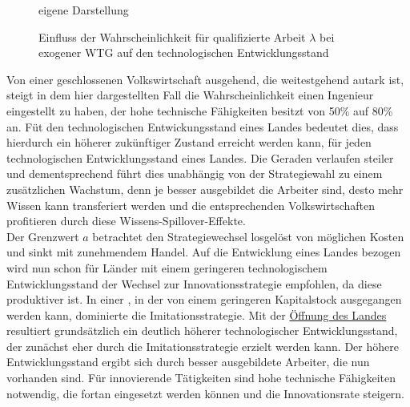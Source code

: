 	\begin{figure}[htbp] 
		\hfill{}  eigene Darstellung
		\caption{Einfluss der Wahrscheinlichkeit für qualifizierte Arbeit $\lambda$ bei exogener WTG auf den technologischen Entwicklungsstand}
		\label{lambdaExo}
	\end{figure}
%
Von einer geschlossenen Volkswirtschaft ausgehend, die weitestgehend autark ist, steigt in dem hier dargestellten Fall die Wahrscheinlichkeit einen Ingenieur eingestellt zu haben, der hohe technische Fähigkeiten besitzt von 50\% auf 80\% an. Füt den technologischen Entwickungsstand eines Landes bedeutet dies, dass hierdurch ein höherer zukünftiger Zustand erreicht werden kann, für jeden technologischen Entwicklungsstand eines Landes. Die Geraden verlaufen steiler und dementsprechend führt dies unabhängig von der Strategiewahl zu einem zusätzlichen Wachstum, denn je besser ausgebildet die Arbeiter sind, desto mehr Wissen kann transferiert werden und die entsprechenden Volkswirtschaften profitieren durch diese Wissens-Spillover-Effekte.\\ 
%
Der Grenzwert $\hat{a}$ betrachtet den Strategiewechsel losgelöst von möglichen Kosten und sinkt mit zunehmendem Handel. Auf die Entwicklung eines Landes bezogen wird nun schon für Länder mit einem geringeren technologischem Entwicklungsstand der Wechsel zur \textcolor[rgb]{0.74,0.97,0.22}{Innovationsstrategie} empfohlen, da diese produktiver ist. In einer , in der von einem geringeren Kapitalstock ausgegangen werden kann, dominierte die \textcolor[rgb]{0,0.32,0}{Imitationsstrategie}. Mit der \underline{Öffnung des Landes} resultiert grundsätzlich ein deutlich höherer technologischer Entwicklungsstand, der zunächst eher durch die \textcolor[rgb]{0,0.32,0}{Imitationsstrategie} erzielt werden kann.  Der höhere Entwicklungsstand ergibt sich durch besser ausgebildete Arbeiter, die nun vorhanden sind. Für innovierende Tätigkeiten sind hohe technische Fähigkeiten notwendig, die fortan eingesetzt werden können und die Innovationsrate steigern.\\
